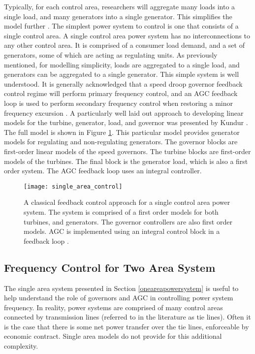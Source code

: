 Typically, for each control area, researchers will aggregate many loads into a single load, and many generators into a single generator. This simplifies the model further \cite{Grainger1994}. The simplest power system to control is one that consists of a single control area. A single control area power system has no interconnections to any other control area. It is comprised of a consumer load demand, and a set of generators, some of which are acting as regulating units. As previously mentioned, for modelling simplicity, loads are aggregated to a single load, and generators can be aggregated to a single generator. This simple system is well understood. It is generally acknowledged that a speed droop governor feedback control regime will perform primary frequency control, and an AGC feedback loop is used to perform secondary frequency control when restoring a minor frequency excursion \cite{Wood2013, Grainger1994, Kothari2011, Kundur1994}. A particularly well laid out approach to developing linear models for the turbine, generator, load, and governor was presented by Kundur \cite{Kundur1994}. The full model is shown in Figure \ref{fig:singleareacontrol}. This particular model provides generator models for regulating and non-regulating generators. The governor blocks are first-order linear models of the speed governors. The turbine blocks are first-order models of the turbines. The final block is the generator load, which is also a first order system. The AGC feedback loop uses an integral controller.

\begin{figure}[ht]
\centering
\texttt{[image: single\_area\_control]}
\caption{A classical feedback control approach for a single control area power system. The system is comprised of a first order models for both turbines, and generators. The governor controllers are also first order models. AGC is implemented using an integral control block in a feedback loop \cite{Kundur1994}.}
\label{fig:singleareacontrol}
\end{figure}

\newpage

\subsection{Frequency Control for Two Area System}
The single area system presented in Section \ref{oneareapowersystem} is useful to help understand the role of governors and AGC in controlling power system frequency. In reality, power systems are comprised of many control areas connected by transmission lines (referred to in the literature as tie lines). Often it is the case that there is some net power transfer over the tie lines, enforceable by economic contract. Single area models do not provide for this additional complexity.

